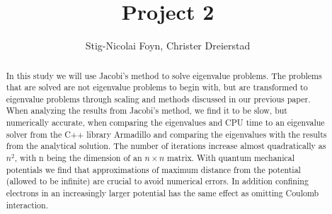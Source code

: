 \documentclass{emulateapj}
\begin{document}
\title{Project 2}

\author{Stig-Nicolai Foyn, Christer Dreierstad}




\begin{abstract}
In this study we will use Jacobi's method to solve eigenvalue problems. The problems that are solved are not eigenvalue problems to begin with, but are transformed to eigenvalue problems through scaling and methods discussed in our previous paper\cite{1}. When analyzing the results from Jacobi's method, we find it to be slow, but numerically accurate, when comparing the eigenvalues and CPU time to an eigenvalue solver from the C++ library Armadillo and comparing the eigenvalues with the results from the analytical solution. The number of iterations increase almost quadratically as $n^2$, with n being the dimension of an $n \times n$ matrix. With quantum mechanical potentials we find that approximations of maximum distance from the potential (allowed to be infinite) are crucial to avoid numerical errors. In addition confining electrons in an increasingly larger potential has the same effect as omitting Coulomb interaction. 

\end{abstract}

\end{document}
